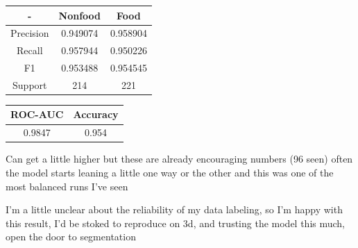 \begin{center}
 \begin{tabular}{||c c c||}
 \hline
 - & Nonfood & Food \\ [0.5ex]
 \hline\hline
Precision & 0.949074 & 0.958904 \\
 \hline
Recall & 0.957944 & 0.950226 \\
 \hline
F1 & 0.953488 & 0.954545 \\
 \hline
Support & 214 & 221 \\ [1ex]
 \hline
\end{tabular}

\end{center}
\begin{center}
 \begin{tabular}{||c c||}
 \hline
 ROC-AUC & Accuracy \\ [0.5ex]
 \hline\hline
  0.9847 & 0.954 \\ [1ex]
 \hline
\end{tabular}
\end{center}

Can get a little higher but these are already encouraging numbers (96 seen) often the model starts leaning a little
one way or the other and this was one of the most balanced runs I've seen

I'm a little unclear about the reliability of my data labeling, so I'm happy with this result, I'd be stoked
to reproduce on 3d, and trusting the model this much, open the door to segmentation
